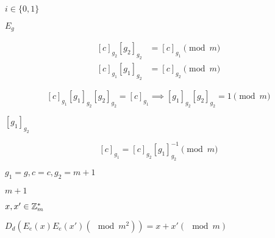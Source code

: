 \documentclass[10pt]{book}
\begin{document}
\begin{mdSnippets}
\begin{mdDisplaySnippet}[cf369d9476ebea52b7586bd8436f379c]
\end{mdDisplaySnippet}%
\begin{mdInlineSnippet}[86ba3989f24a915b0b9e5d5d2e3e577f]%
$i\in \{0,1\}$\end{mdInlineSnippet}%
\begin{mdInlineSnippet}%
$E_g$\end{mdInlineSnippet}%
\begin{mdDisplaySnippet}[30e54458b4d047a44fdec90aa909b826]%
\[%
\begin{aligned}
[c]_{g_2}[g_2]_{g_2} &= [c]_{g_1} \pmod m \\
[c]_{g_1}[g_1]_{g_2} &= [c]_{g_2} \pmod m
\end{aligned}
\]%
\end{mdDisplaySnippet}%
\begin{mdDisplaySnippet}[83977433a0a55b4c54af5962960229fc]%
\[%
[c]_{g_1}[g_1]_{g_2}[g_2]_{g_2} = [c]_{g_1} \implies [g_1]_{g_2}[g_2]_{g_2} = 1 \pmod m
\]%
\end{mdDisplaySnippet}%
\begin{mdInlineSnippet}[5bc997afbd0192a61c20c5c320b3600d]%
$[g_1]_{g_2}$\end{mdInlineSnippet}%
\begin{mdDisplaySnippet}%
\[%
[c]_{g_1} = [c]_{g_2}[g_1]_{g_2}^{-1} \pmod m
\]%
\end{mdDisplaySnippet}%
\begin{mdInlineSnippet}[46f935c3ee4da9933c99c2663070627b]%
$g_1 = g, c = c, g_2 = m+1$\end{mdInlineSnippet}%
\begin{mdInlineSnippet}[c2ae2329632cc86715f8a4de7a056880]%
$m+1$\end{mdInlineSnippet}%
\begin{mdInlineSnippet}[753bd9ca5bd0e8dee271c3b1cc6eb0af]%
$x,x' \in \mathbb{Z}^*_m$\end{mdInlineSnippet}%
\begin{mdInlineSnippet}[20ca48d0f6862bf95ea84b011a0666d7]%
$D_d(E_e(x)E_e(x') (\mod m^2)) = x+x' (\mod m)$\end{mdInlineSnippet}%
\begin{mdInlineSnippet}[62595564bd618f6d34a48b28aa849645]%

\end{mdInlineSnippet}
\end{mdSnippets}
\end{document}
